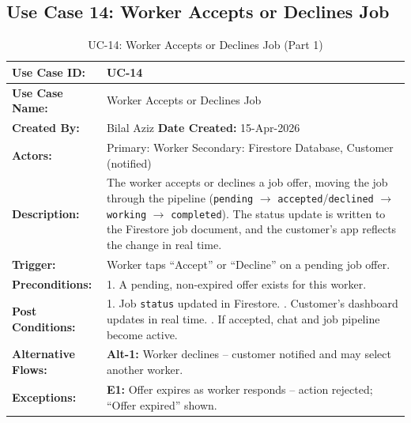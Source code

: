 \newpage

\subsection*{Use Case 14: Worker Accepts or Declines Job}

{\small
\renewcommand{\arraystretch}{1.05}
\begin{table}[H]
\centering
\begin{tabular}{|p{3cm}|p{11.2cm}|}
\hline
\textbf{Use Case ID:} & UC-14 \\ \hline
\textbf{Use Case Name:} & Worker Accepts or Declines Job \\ \hline
\textbf{Created By:} & Bilal Aziz \hfill \textbf{Date Created:} 15-Apr-2026 \\ \hline
\textbf{Actors:} & Primary: Worker \quad Secondary: Firestore Database, Customer (notified) \\ \hline
\textbf{Description:} & The worker accepts or declines a job offer, moving the job through the pipeline (\texttt{pending} $\rightarrow$ \texttt{accepted}/\texttt{declined} $\rightarrow$ \texttt{working} $\rightarrow$ \texttt{completed}). The status update is written to the Firestore job document, and the customer's app reflects the change in real time. \\ \hline
\textbf{Trigger:} & Worker taps ``Accept'' or ``Decline'' on a pending job offer. \\ \hline
\textbf{Preconditions:} & 1. A pending, non-expired offer exists for this worker. \\ \hline
\textbf{Post Conditions:} & 1. Job \texttt{status} updated in Firestore. \newline 2. Customer's dashboard updates in real time. \newline 3. If accepted, chat and job pipeline become active. \\ \hline
\textbf{Alternative Flows:} & \textbf{Alt-1:} Worker declines -- customer notified and may select another worker. \\ \hline
\textbf{Exceptions:} & \textbf{E1:} Offer expires as worker responds -- action rejected; ``Offer expired'' shown. \\ \hline
\end{tabular}
\caption*{UC-14: Worker Accepts or Declines Job (Part 1)}
\end{table}
}

\newpage

